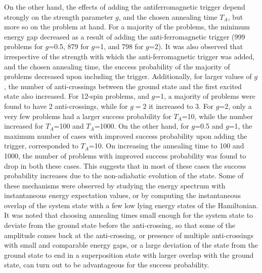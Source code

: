 \documentclass[main.tex]{subfiles}
\begin{document}
On the other hand, the effects of adding the antiferromagnetic trigger depend strongly on the strength parameter $g$, and the chosen annealing time $T_A$, but more so on the problem at hand. For a majority of the problems, the minimum energy gap decreased as a result of adding the anti-ferromagnetic trigger (999 problems for $g$=0.5, 879 for $g$=1, and 798 for $g$=2). It was also observed that irrespective of the strength with which the anti-ferromagnetic trigger was added, and the chosen annealing time, the success probability of the majority of problems decreased upon including the trigger. Additionally, for larger values of $g$, the number of anti-crossings between the ground state and the first excited state also increased. For 12-spin problems, and $g$=1, a majority of problems were found to have 2 anti-crossings, while for $g=2$ it increased to 3. For $g$=2, only a very few problems had a larger success probability for $T_A$=10, while the number increased for $T_A$=100 and $T_A$=1000. On the other hand, for $g$=0.5 and $g$=1, the maximum number of cases with improved success probability upon adding the trigger, corresponded to $T_A$=10. On increasing the annealing time to 100 and 1000, the number of problems with improved success probability was found to drop in both these cases. This suggests that in most of these cases the success probability increases due to the non-adiabatic evolution of the state. Some of these mechanisms were observed by studying the energy spectrum with instantaneous energy expectation values, or by computing the instantaneous overlap of the system state with a few low lying energy states of the Hamiltonian. It was noted that choosing annealing times small enough for the system state to deviate from the ground state before the anti-crossing, so that some of the amplitude comes back at the anti-crossing, or presence of multiple anti-crossings with small and comparable energy gaps, or a large deviation of the state from the ground state to end in a superposition state with larger overlap with the ground state, can turn out to be advantageous for the success probability.\\
\end{document}
